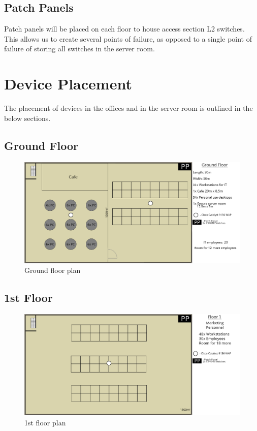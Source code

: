 \subsection{Patch Panels}
Patch panels will be placed on each floor to house access section L2 switches. This allows us to create several points of failure, as opposed to a single point of failure of storing all switches in the server room.
\section{Device Placement}
The placement of devices in the offices and in the server room is outlined in the below sections.
\subsection{Ground Floor}
\begin{figure}[H]
    \includegraphics[width=15cm]{Figures/ground.png}
    \caption{Ground floor plan}
    \label{fig:ground_floor}
\end{figure}
\subsection{1st Floor}
\begin{figure}[H]
    \includegraphics[width=15cm]{Figures/1st-floor.png}
    \caption{1st floor plan}
    \label{fig:1st_floor}
\end{figure}
